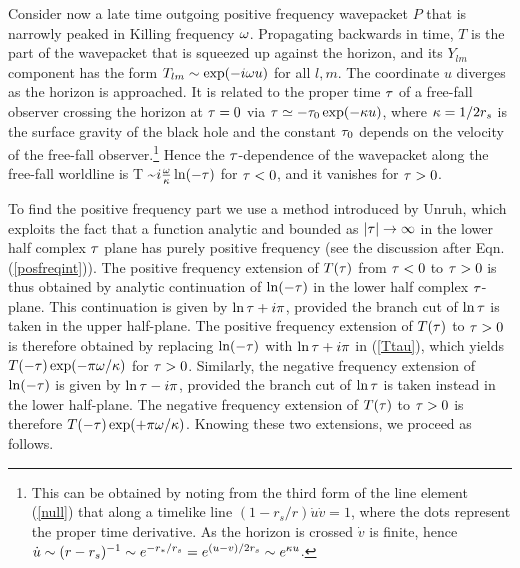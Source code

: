 \documentclass[12pt]{article}
\begin{document}
Consider now a late time outgoing positive 
frequency wavepacket $P$
that is narrowly peaked in Killing frequency $\omega$.  Propagating
backwards in time, $T$ is the part of
the wavepacket that is squeezed up against the horizon,
and its $Y_{lm}$ component 
has the form $T_{lm}\sim \exp(-i\omega u)$ for all $l,m$.
The coordinate $u$ diverges as the horizon is
approached. It is related to the proper time $\tau$ of a 
free-fall observer crossing the horizon at $\tau=0$ via 
$\tau\simeq -\tau_0\exp(-\kappa u)$,
where $\kappa=1/2r_s$ is the surface gravity of the black hole and the
constant $\tau_0$ depends on the velocity of the free-fall
observer.\footnote{This can be obtained by noting from the
third form of the line element (\ref{null}) that along a
timelike line $(1-r_s/r)\dot{u}\dot{v}=1$,
where the dots represent the proper time derivative.
As the horizon is crossed $\dot{v}$ is finite, hence 
$\dot{u}\sim (r-r_s)^{-1}\sim e^{-r_*/r_s}= 
e^{(u-v)/2r_s}\sim e^{\kappa u}$.}
 Hence the $\tau$-dependence of the wavepacket
along the free-fall worldline is
\beq
T \sim \exp\(i\frac{\o}{\k}\ln(-\t)\)
\label{Ttau}
\eeq
for $\tau<0$, and it vanishes for $\tau>0$.

To find the positive frequency part we use 
a method introduced by Unruh\cite{Unruh:db},
which exploits the fact that a function
analytic and bounded as $|\tau|\rightarrow\infty$
in the lower half complex $\tau$ plane 
has purely positive frequency 
(see the discussion after Eqn. (\ref{posfreqint})).
The positive frequency extension of $T(\tau)$  
from $\tau<0$ to $\tau>0$ is thus obtained
by analytic continuation of $\ln (-\tau)$
in the lower half complex 
$\tau$-plane. This continuation is 
given by $\ln\tau+i\pi$, 
provided the branch cut of $\ln\tau$
is taken in the upper half-plane.
The positive frequency extension
of $T(\tau)$ to $\tau>0$ is therefore
obtained by replacing $\ln(-\tau)$ 
with $\ln\tau+ i\pi$ in (\ref{Ttau}), which yields 
$T(-\tau)\exp(- \pi \omega/\kappa)$ for $\tau>0$.
Similarly, the negative frequency extension
of $\ln (-\tau)$ is
given by $\ln\tau-i\pi$, 
provided the branch cut of $\ln\tau$
is taken instead in the lower half-plane.
The negative frequency extension
of $T(\tau)$ to $\tau>0$ is therefore
$T(-\tau)\exp(+ \pi \omega/\kappa)$. Knowing these
two extensions, we proceed as follows.
\end{document}
